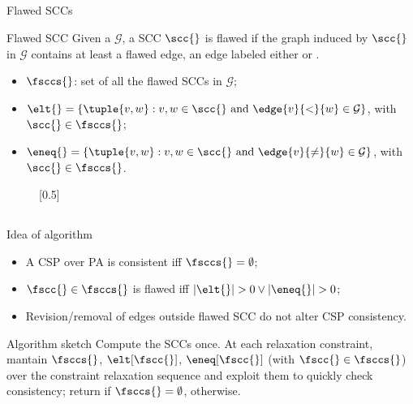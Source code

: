 \subsection{}
\begin{frame}{Flawed SCCs}
	\begin{block}{Flawed SCC}
		Given a \tlGraph{} $\mathcal{G}$, a SCC $\scc{}$ is flawed if the graph induced by $\scc{}$ in $\mathcal{G}$  contains at least a flawed edge, \ie{} an edge labeled either \sQuote{$<$} or \sQuote{$\not =$}.
	\end{block}

	\begin{itemize}
		\item $\fsccs{}$: set of all the flawed SCCs in $\mathcal{G}$;
		\item $\elt{} = \{ \tuple{v,w} :  v,w \in \scc{} \mbox{ and } \edge{v}{<}{w} \in \mathcal{G}\}$, with $\scc{} \in \fsccs{}$;
		\item $\eneq{} = \{ \tuple{v,w} :  v,w \in \scc{} \mbox{ and } \edge{v}{\not =}{w} \in \mathcal{G}\}$, with $\scc{} \in \fsccs{}$.
	\end{itemize}

	\begin{figure}
		\centering
	\end{figure}
	
\end{frame}

\subsection{}
\begin{frame}{Idea of \DPASAT{} algorithm}

	\begin{itemize}
		\item A CSP over PA is consistent iff $\fsccs{} = \emptyset$;
		\item $\fscc{} \in \fsccs{}$ is flawed iff $|\elt{}|>0 \lor |\eneq{}|>0$;
		\item Revision/removal of edges outside flawed SCC do not alter CSP consistency.
	\end{itemize}

	\begin{exampleblock}{Algorithm sketch}
		Compute the SCCs once. At each relaxation constraint, mantain $\fsccs{}$, $\elt[\fscc{}]$, $\eneq[\fscc{}]$ (with $\fscc{} \in \fsccs{}$) over the constraint relaxation sequence and exploit them to quickly check consistency; return  if $\fsccs{} = \emptyset$,  otherwise.
	\end{exampleblock}
		
\end{frame}
	
